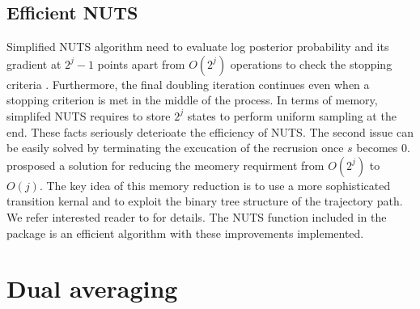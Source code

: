 \documentclass{article}
\begin{document}

\subsection{Efficient NUTS}

Simplified NUTS algorithm need to evaluate log posterior probability and its gradient at $2^j-1$ points apart from $O(2^j)$ operations to check the stopping criteria \cite{hoffman2014nuts}. Furthermore, the final doubling iteration continues even when a stopping criterion is met in the middle of the process. In terms of memory, simplifed NUTS requires to store $2^j$ states to perform uniform sampling at the end. These facts seriously deterioate the efficiency of NUTS. The second issue can be easily solved by terminating the excucation of the recrusion once $s$ becomes $0$. \citet{hoffman2014nuts} prosposed a solution for reducing the meomery requirment from $O(2^j)$ to $O(j)$. The key idea of this memory reduction is to use a more sophisticated transition kernal and to exploit the binary tree structure of the trajectory path. We refer interested reader to \citet{hoffman2014nuts} for details. The NUTS function included in the package is an efficient algorithm with these improvements implemented.

\section{Dual averaging}
\end{document}
